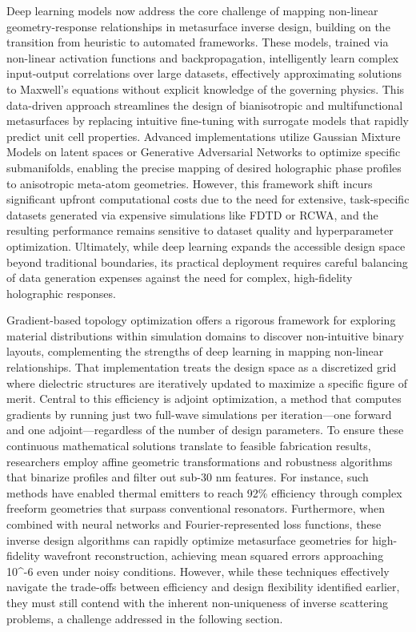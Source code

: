 \documentclass[11pt]{article}
\begin{document}
Deep learning models now address the core challenge of mapping non-linear geometry-response relationships in metasurface inverse design, building on the transition from heuristic to automated frameworks. These models, trained via non-linear activation functions and backpropagation, intelligently learn complex input-output correlations over large datasets, effectively approximating solutions to Maxwell's equations without explicit knowledge of the governing physics. This data-driven approach streamlines the design of bianisotropic and multifunctional metasurfaces by replacing intuitive fine-tuning with surrogate models that rapidly predict unit cell properties. Advanced implementations utilize Gaussian Mixture Models on latent spaces or Generative Adversarial Networks to optimize specific submanifolds, enabling the precise mapping of desired holographic phase profiles to anisotropic meta-atom geometries. However, this framework shift incurs significant upfront computational costs due to the need for extensive, task-specific datasets generated via expensive simulations like FDTD or RCWA, and the resulting performance remains sensitive to dataset quality and hyperparameter optimization. Ultimately, while deep learning expands the accessible design space beyond traditional boundaries, its practical deployment requires careful balancing of data generation expenses against the need for complex, high-fidelity holographic responses. \citep{doi_10_1515_nanoph_2019_0474_d2187501} \citep{doi_10_48550_arxiv_2204_00433_1c5cfd3e} \citep{doi_10_3390_photonics12100947_b44bdefd}

Gradient-based topology optimization offers a rigorous framework for exploring material distributions within simulation domains to discover non-intuitive binary layouts, complementing the strengths of deep learning in mapping non-linear relationships. That implementation treats the design space as a discretized grid where dielectric structures are iteratively updated to maximize a specific figure of merit. Central to this efficiency is adjoint optimization, a method that computes gradients by running just two full-wave simulations per iteration---one forward and one adjoint---regardless of the number of design parameters. To ensure these continuous mathematical solutions translate to feasible fabrication results, researchers employ affine geometric transformations and robustness algorithms that binarize profiles and filter out sub-30 nm features. For instance, such methods have enabled thermal emitters to reach 92\% efficiency through complex freeform geometries that surpass conventional resonators. Furthermore, when combined with neural networks and Fourier-represented loss functions, these inverse design algorithms can rapidly optimize metasurface geometries for high-fidelity wavefront reconstruction, achieving mean squared errors approaching 10\^{}-6 even under noisy conditions. However, while these techniques effectively navigate the trade-offs between efficiency and design flexibility identified earlier, they must still contend with the inherent non-uniqueness of inverse scattering problems, a challenge addressed in the following section. \citep{doi_10_1002_adom_202500249_9967e710} \citep{doi_10_48550_arxiv_2603_15210_fdcfb92f} \citep{doi_10_1515_nanoph_2020_0579_8812c5b1}
\end{document}
